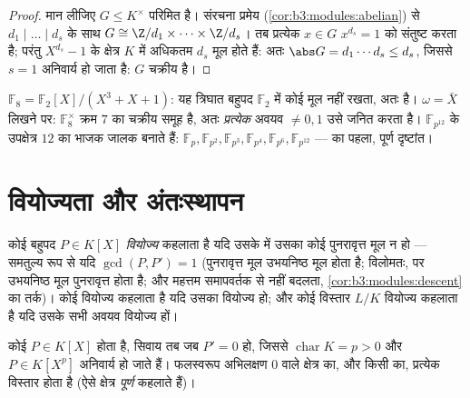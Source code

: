 \begin{proof}
मान लीजिए $G \leq K^\times$ परिमित है। संरचना प्रमेय (\cref{cor:b3:modules:abelian}) से $d_1 \mid \dots \mid d_s$ के
साथ $G \cong \Z/d_1 \times \dots
\times \Z/d_s$। तब प्रत्येक $x \in G$ $x^{d_s} = 1$ को संतुष्ट करता है; परंतु
$X^{d_s} - 1$ के क्षेत्र $K$ में अधिकतम $d_s$ मूल होते हैं: अतः $\abs G = d_1\cdots d_s \leq d_s$,
जिससे $s = 1$ अनिवार्य हो जाता है: $G$ चक्रीय है।
\end{proof}

\begin{example}\label{ex:b3:galois:f8}
$\mathbb F_8 = \mathbb F_2[X]/(X^3 + X + 1)$: यह त्रिघात बहुपद $\mathbb F_2$ में कोई मूल नहीं रखता, अतः 
है। $\omega =
\bar X$ लिखने पर: $\mathbb F_8^\times$ क्रम $7$ का चक्रीय समूह है, अतः
\emph{प्रत्येक} अवयव $\neq 0, 1$ उसे जनित करता है। $\mathbb F_{p^{12}}$ के उपक्षेत्र
$12$ का भाजक जालक बनाते हैं: $\mathbb F_p, \mathbb F_{p^2}, \mathbb F_{p^3}, \mathbb F_{p^4},
\mathbb F_{p^6}, \mathbb F_{p^{12}}$ ---  का पहला,
पूर्ण दृष्टांत।
\end{example}

\section{वियोज्यता और अंतःस्थापन}

\begin{definition}\label{def:b3:galois:separable}
कोई बहुपद $P \in K[X]$ \emph{वियोज्य} कहलाता है
यदि उसके  में उसका कोई पुनरावृत्त मूल न हो ---
समतुल्य रूप से यदि $\gcd(P, P') = 1$ (पुनरावृत्त मूल उभयनिष्ठ मूल होता है;
विलोमतः,  पर उभयनिष्ठ मूल पुनरावृत्त होता है; और
महत्तम समापवर्तक  से नहीं बदलता, \cref{cor:b3:modules:descent} का तर्क)।
कोई  वियोज्य कहलाता है यदि उसका  वियोज्य
हो; और कोई विस्तार $L/K$ वियोज्य कहलाता है यदि उसके सभी अवयव
वियोज्य हों।
\end{definition}

\begin{proposition}\label{prop:b3:galois:perfect}
कोई \emph{} $P \in K[X]$  होता है, सिवाय तब जब $P' = 0$ हो,
जिससे $\operatorname{char} K = p > 0$ और $P \in K[X^p]$ अनिवार्य हो जाते हैं। फलस्वरूप अभिलक्षण
$0$ वाले क्षेत्र का, और किसी  का, प्रत्येक 
विस्तार  होता है (ऐसे क्षेत्र \emph{पूर्ण} कहलाते हैं)।
\end{proposition}

